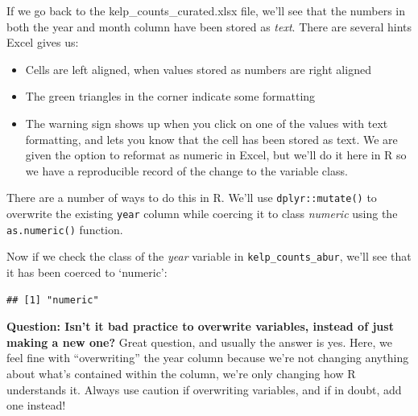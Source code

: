 \documentclass[]{book}
\newenvironment{Shaded}{\begin{snugshade}}{\end{snugshade}}
\newcommand{\CommentTok}[1]{\textcolor[rgb]{0.56,0.35,0.01}{\textit{#1}}}
\newcommand{\DataTypeTok}[1]{\textcolor[rgb]{0.13,0.29,0.53}{#1}}
\newcommand{\KeywordTok}[1]{\textcolor[rgb]{0.13,0.29,0.53}{\textbf{#1}}}
\newcommand{\NormalTok}[1]{#1}
\newcommand{\OperatorTok}[1]{\textcolor[rgb]{0.81,0.36,0.00}{\textbf{#1}}}
\newcommand{\StringTok}[1]{\textcolor[rgb]{0.31,0.60,0.02}{#1}}
\providecommand{\tightlist}{%
  \setlength{\itemsep}{0pt}\setlength{\parskip}{0pt}}
\begin{document}
If we go back to the kelp\_counts\_curated.xlsx file, we'll see that the numbers in both the year and month column have been stored as \emph{text}. There are several hints Excel gives us:

\begin{itemize}
\tightlist
\item
  Cells are left aligned, when values stored as numbers are right aligned
\item
  The green triangles in the corner indicate some formatting
\item
  The warning sign shows up when you click on one of the values with text formatting, and lets you know that the cell has been stored as text. We are given the option to reformat as numeric in Excel, but we'll do it here in R so we have a reproducible record of the change to the variable class.
\end{itemize}

There are a number of ways to do this in R. We'll use \texttt{dplyr::mutate()} to overwrite the existing \texttt{year} column while coercing it to class \emph{numeric} using the \texttt{as.numeric()} function.

\begin{Shaded}
\end{Shaded}

Now if we check the class of the \emph{year} variable in \texttt{kelp\_counts\_abur}, we'll see that it has been coerced to `numeric':

\begin{Shaded}
\end{Shaded}

\begin{verbatim}
## [1] "numeric"
\end{verbatim}

\textbf{Question: Isn't it bad practice to overwrite variables, instead of just making a new one?} Great question, and usually the answer is yes. Here, we feel fine with ``overwriting'' the year column because we're not changing anything about what's contained within the column, we're only changing how R understands it. Always use caution if overwriting variables, and if in doubt, add one instead!
\end{document}
